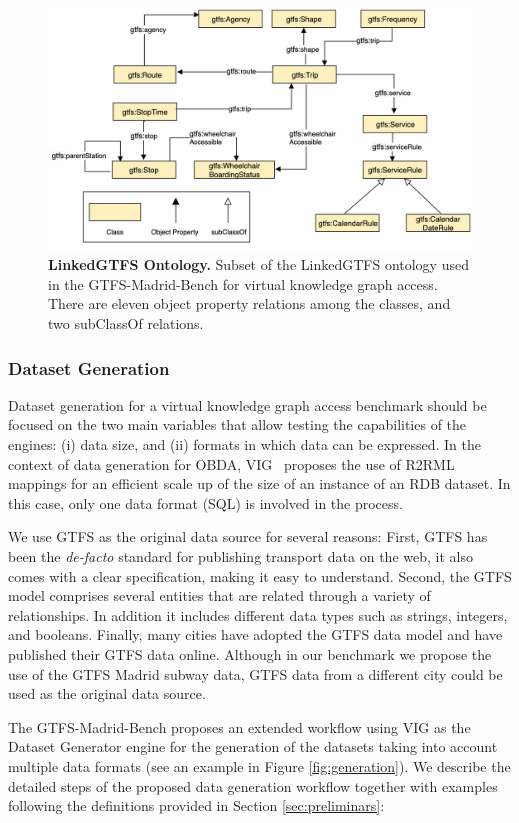 \begin{figure}
    \centering
    \includegraphics[width=0.8\linewidth]{figures/GTFSontology.png}
    \caption[The LinkedGTFS Ontology]{\textbf{LinkedGTFS Ontology.} Subset of the LinkedGTFS ontology used in the GTFS-Madrid-Bench for virtual knowledge graph access. There are eleven object property relations among the classes, and two subClassOf relations.}
    \label{fig:gtfsOntology}
\end{figure}

\subsubsection{Dataset Generation}

Dataset generation for a virtual knowledge graph access benchmark should be focused on the two main variables that allow testing the capabilities of the engines: (i) data size, and (ii) formats in which data can be expressed. In the context of data generation for OBDA, VIG~\citep{lantivig} proposes the use of R2RML mappings for an efficient scale up of the size of an instance of an RDB dataset. In this case, only one data format (SQL) is involved in the process. 

We use GTFS as the original data source for several reasons: First, GTFS has been the \textit{de-facto} standard for publishing transport data on the web, it also comes with a clear specification, making it easy to understand. Second, the GTFS model comprises several entities that are related through a variety of relationships. In addition it includes different data types such as strings, integers, and booleans. Finally, many cities have adopted the GTFS data model and have published their GTFS data online. Although in our benchmark we propose the use of the GTFS Madrid subway data, GTFS data from a different city could be used as the original data source.

The GTFS-Madrid-Bench proposes an extended workflow using VIG as the Dataset Generator engine for the generation of the datasets taking into account multiple data formats (see an example in Figure \ref{fig:generation}). We describe the detailed steps of the proposed data generation workflow together with examples following the definitions provided in Section \ref{sec:preliminars}:

